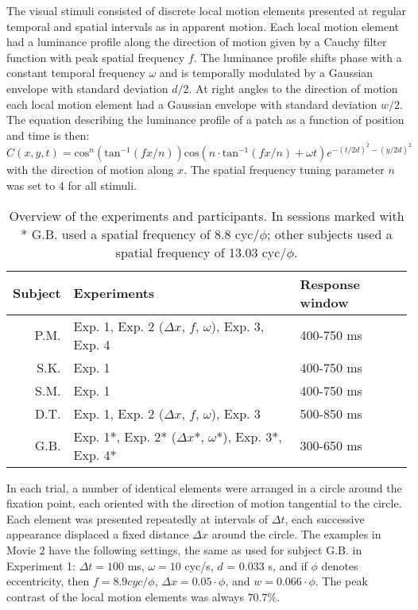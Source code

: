 \documentclass[11pt]{amsart}
\begin{document}
The visual stimuli consisted of discrete local motion elements
presented at regular temporal and spatial intervals as in apparent
motion. Each local motion element had a luminance profile along the
direction of motion given by a Cauchy filter function
\cite{Klein:1985rz} with peak spatial frequency $f$. The luminance
profile shifts phase with a constant temporal frequency $\omega$ and
is temporally modulated by a Gaussian envelope with standard deviation
$d/2$. At right angles to the direction of motion each local motion
element had a Gaussian envelope with standard deviation $w/2$. The
equation describing the luminance profile of a patch as a function of
position and time is then:
\begin{equation}
C(x, y, t) = \mathrm{cos}^n(\mathrm{tan}^{-1}(fx/n))\mathrm{cos}(n \cdot \mathrm{tan}^{-1}(fx/n) + {\omega}t) e^{-(t/2d)^2-(y/2d)^2}
\end{equation}
with the direction of motion along $x$. The spatial frequency tuning
parameter $n$ was set to 4 for all stimuli.

\begin{table}
\begin{tabular}{r | l l}
Subject & Experiments & Response window \\
\hline
P.M. & Exp. 1, Exp. 2 (${\Delta}x$, $f$, $\omega$), Exp. 3, Exp. 4 & 400-750 ms \\
S.K. & Exp. 1 & 400-750 ms \\
S.M. & Exp. 1 & 400-750 ms \\
D.T. & Exp. 1, Exp. 2 (${\Delta}x$, $f$, $\omega$), Exp. 3 & 500-850 ms \\
G.B. & Exp. 1*, Exp. 2* (${\Delta}x$*, $\omega$*), Exp. 3*, Exp. 4* & 300-650 ms \\
\hline
\end{tabular}
\caption{Overview of the experiments and participants. In sessions marked with
  * G.B. used a spatial frequency of 8.8 cyc/${\phi}$; other subjects used a spatial frequency of 13.03 cyc/${\phi}$.}
\end{table}

In each trial, a number of identical elements were arranged in a
circle around the fixation point, each oriented with the direction of
motion tangential to the circle. Each element was presented repeatedly
at intervals of ${\Delta}t$, each successive appearance displaced a
fixed distance ${\Delta}x$ around the circle. The examples in Movie 2
have the following settings, the same as used for subject G.B. in
Experiment 1: ${\Delta}t = 100$ ms, $\omega = 10$ cyc/s, $d$ = 0.033 s, and
if $\phi$ denotes eccentricity, then $f = 8.9 cyc/\phi$,
${\Delta}x = 0.05 \cdot \phi$, and $w = 0.066 \cdot \phi$. The peak
contrast of the local motion elements was always $70.7\%$.
\end{document}
